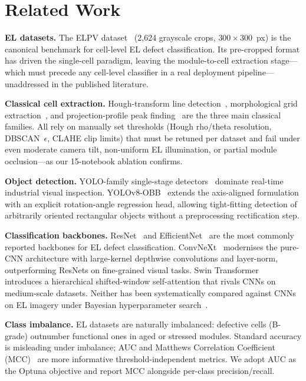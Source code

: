 \documentclass[conference]{IEEEtran}
\begin{document}
\section{Related Work}
\label{sec:related}

\textbf{EL datasets.} The ELPV dataset~\cite{deitsch2019} (2{,}624 grayscale crops, $300\times300$~px) is the canonical benchmark for cell-level EL defect classification. Its pre-cropped format has driven the single-cell paradigm, leaving the module-to-cell extraction stage---which must precede any cell-level classifier in a real deployment pipeline---unaddressed in the published literature.

\textbf{Classical cell extraction.} Hough-transform line detection~\cite{duda1972}, morphological grid extraction~\cite{soille2003}, and projection-profile peak finding~\cite{wong1982} are the three main classical families. All rely on manually set thresholds (Hough rho/theta resolution, DBSCAN~$\epsilon$, CLAHE clip limits) that must be retuned per dataset and fail under even moderate camera tilt, non-uniform EL illumination, or partial module occlusion---as our 15-notebook ablation confirms.

\textbf{Object detection.} YOLO-family single-stage detectors~\cite{redmon2016,jocher2023} dominate real-time industrial visual inspection. YOLOv8-OBB~\cite{jocher2023} extends the axis-aligned formulation with an explicit rotation-angle regression head, allowing tight-fitting detection of arbitrarily oriented rectangular objects without a preprocessing rectification step.

\textbf{Classification backbones.} ResNet~\cite{he2016} and EfficientNet~\cite{tan2019} are the most commonly reported backbones for EL defect classification. ConvNeXt~\cite{liu2022} modernises the pure-CNN architecture with large-kernel depthwise convolutions and layer-norm, outperforming ResNets on fine-grained visual tasks. Swin Transformer~\cite{liu2021} introduces a hierarchical shifted-window self-attention that rivals CNNs on medium-scale datasets. Neither has been systematically compared against CNNs on EL imagery under Bayesian hyperparameter search~\cite{akiba2019}.

\textbf{Class imbalance.} EL datasets are naturally imbalanced: defective cells (B-grade) outnumber functional ones in aged or stressed modules. Standard accuracy is misleading under imbalance; AUC and Matthews Correlation Coefficient (MCC)~\cite{deitsch2019} are more informative threshold-independent metrics. We adopt AUC as the Optuna objective and report MCC alongside per-class precision/recall.
\end{document}
